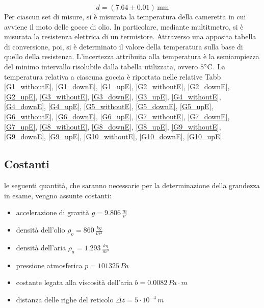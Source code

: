 \documentclass[]{article}
\let\oldsubsection\subsection%
\renewcommand{\subsection}{%
	\renewcommand{\theequation}{\thesubsection.\arabic{equation}}%
	\oldsubsection}%
\begin{document}
    \begin{equation}
        \label{misura_Rb}
        d = (7.64 \pm 0.01) \, \text{mm}
    \end{equation} 
    Per ciascun set di misure, si è misurata la temperatura della cameretta in cui avviene il moto delle gocce di olio. In particolare, mediante multitmetro, si è misurata la resistenza elettrica di un termistore. Attraverso una apposita tabella di conversione, poi, si è determinato il valore della temperatura sulla base di quello della resistenza. L'incertezza attribuita alla temperatura è la semiampiezza del minimo intervallo risolubile dalla tabella utilizzata, ovvero $5 \degree \text{C}$.
    La temperatura relativa a ciascuna goccia è riportata nelle relative Tabb \ref{G1_withoutE}, \ref{G1_downE}, \ref{G1_upE}, \ref{G2_withoutE}, \ref{G2_downE}, \ref{G2_upE}, \ref{G3_withoutE}, \ref{G3_downE}, \ref{G3_upE}, \ref{G4_withoutE}, \ref{G4_downE}, \ref{G4_upE}, \ref{G5_withoutE}, \ref{G5_downE}, \ref{G5_upE}, \ref{G6_withoutE}, \ref{G6_downE}, \ref{G6_upE}, \ref{G7_withoutE}, \ref{G7_downE}, \ref{G7_upE}, \ref{G8_withoutE}, \ref{G8_downE}, \ref{G8_upE}, \ref{G9_withoutE}, \ref{G9_downE}, \ref{G9_upE}, \ref{G10_withoutE}, \ref{G10_downE}, \ref{G10_upE}.

    \subsection {Costanti}
    \label{par:costanti}

    le seguenti quantità, che saranno necessarie per la determinazione della grandezza in esame, vengno assunte costanti:

    \begin{itemize}

        \item accelerazione di gravità $g = 9.806 \, \frac{m}{s^2}$
        \item densità dell'olio $\rho_o = 860 \, \frac{kg}{m^3}$
        \item densità dell'aria $\rho_a = 1.293 \, \frac{kg}{m^3}$
        \item pressione atmosferica $ p = 101325 \, Pa $
        \item costante legata alla viscosità dell'aria $b = 0.0082 \,  Pa \cdot m $
        \item distanza delle righe del reticolo $ \Delta z = 5 \cdot 10 ^{-4} \, m$
        
    \end{itemize}
\end{document}
